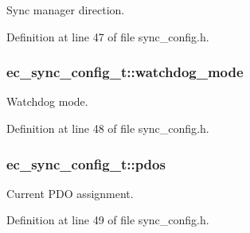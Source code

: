 \-Sync manager direction. 



\-Definition at line 47 of file sync\-\_\-config.\-h.

\subsubsection[{watchdog\-\_\-mode}]{ {\bf ec\-\_\-sync\-\_\-config\-\_\-t\-::watchdog\-\_\-mode}}\label{structec__sync__config__t_a83c2bcdf7c5a9e6541b5f47c13a4d46d}


\-Watchdog mode. 



\-Definition at line 48 of file sync\-\_\-config.\-h.

\subsubsection[{pdos}]{ {\bf ec\-\_\-sync\-\_\-config\-\_\-t\-::pdos}}\label{structec__sync__config__t_ae70642198065ad0381dacdfa21fcebaa}


\-Current \-P\-D\-O assignment. 



\-Definition at line 49 of file sync\-\_\-config.\-h.

